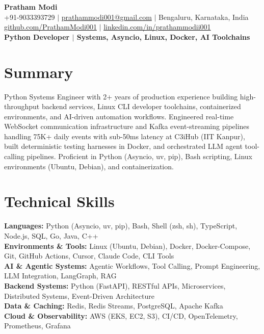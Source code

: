 \documentclass[10pt]{article}
\begin{document}
\begin{center}
{\Huge \textbf{Pratham Modi}} \\[2pt]
+91-9033393729 $\vert$ \href{mailto:prathammodi001@gmail.com}{prathammodi001@gmail.com} $\vert$ Bengaluru, Karnataka, India \\[1pt]
\href{https://github.com/PrathamModi001}{github.com/PrathamModi001} $\vert$ \href{https://www.linkedin.com/in/prathammodii001/}{linkedin.com/in/prathammodii001} \\[2pt]
\textbf{Python Developer $\vert$ Systems, Asyncio, Linux, Docker, AI Toolchains}
\end{center}

\vspace{-6pt}
\section{Summary}
Python Systems Engineer with 2+ years of production experience building high-throughput backend services, Linux CLI developer toolchains, containerized environments, and AI-driven automation workflows. Engineered real-time WebSocket communication infrastructure and Kafka event-streaming pipelines handling 75K+ daily events with sub-50ms latency at C3iHub (IIT Kanpur), built deterministic testing harnesses in Docker, and orchestrated LLM agent tool-calling pipelines. Proficient in Python (Asyncio, uv, pip), Bash scripting, Linux environments (Ubuntu, Debian), and containerization.

\section{Technical Skills}
\textbf{Languages:} Python (Asyncio, uv, pip), Bash, Shell (zsh, sh), TypeScript, Node.js, SQL, Go, Java, C++ \\
\textbf{Environments \& Tools:} Linux (Ubuntu, Debian), Docker, Docker-Compose, Git, GitHub Actions, Cursor, Claude Code, CLI Tools \\
\textbf{AI \& Agentic Systems:} Agentic Workflows, Tool Calling, Prompt Engineering, LLM Integration, LangGraph, RAG \\
\textbf{Backend Systems:} Python (FastAPI), RESTful APIs, Microservices, Distributed Systems, Event-Driven Architecture \\
\textbf{Data \& Caching:} Redis, Redis Streams, PostgreSQL, Apache Kafka \\
\textbf{Cloud \& Observability:} AWS (EKS, EC2, S3), CI/CD, OpenTelemetry, Prometheus, Grafana
\end{document}

